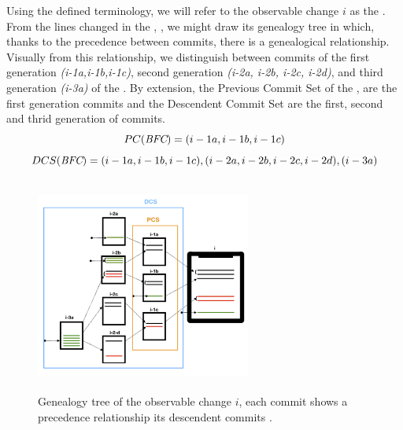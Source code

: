 \documentclass[a4paper, 12pt]{book}
\begin{document}
Using the defined terminology, we will refer to the observable change $i$ as the \BFC. From the lines changed in the \BFC, \LC{\BFC}, we might draw its genealogy tree in which, thanks to the precedence between commits, there is a genealogical relationship. Visually from this relationship, we distinguish between commits of the first generation \emph{(i-1a,i-1b,i-1c)}, second generation \emph{(i-2a, i-2b, i-2c, i-2d)}, and third generation \emph{(i-3a)} of the \BFC. By extension, the Previous Commit Set of the \BFC, are the first generation commits and the Descendent Commit Set are the first, second and thrid generation of commits. 
\[ PC(\emph{BFC}) =  {(i-1a,i-1b,i-1c)}\]
\[ DCS(\emph{BFC}) =  {(i-1a,i-1b,i-1c),(i-2a, i-2b, i-2c, i-2d),(i-3a)}\]

\begin{figure}[ht]
\centering
\includegraphics[width=200pt,height=200pt]{img/visiontree.png}
\caption{Genealogy tree of the observable change $i$, each commit shows a precedence relationship its descendent commits .}
\label{fig:genealogytree}       %
\end{figure}
\end{document}
